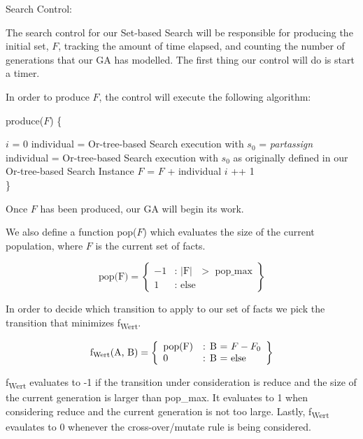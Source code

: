\documentclass[11pt, oneside]{article}   	%
\begin{document}
\noindent Search Control:

\noindent The search control for our Set-based Search will be responsible for producing the initial set, $F$, tracking the amount of time elapsed, and counting the number of generations that our GA has modelled. The first thing our control will do is start a timer.

\noindent In order to produce $F$, the control will execute the following algorithm:

\noindent produce($F$) \{
\begin{algorithmic}[\textfloatsep = 0pt]
    \STATE $i$ = 0
		\STATE individual = Or-tree-based Search execution with $s_0$ = \textit{partassign}
	\ELSE
		\STATE individual = Or-tree-based Search execution with $s_0$ as originally defined in our Or-tree-based Search Instance
	\ENDIF
	\STATE $F$ = $F$ + individual
	\STATE $i$ ++ 1
    \ENDWHILE \\ \}
\end{algorithmic}

\noindent Once $F$ has been produced, our GA will begin its work.

\noindent We also define a function pop($F$) which evaluates the size of the current population, where $F$ is the current set of facts.
 
     \[
         \text{pop(F)} = \left\{\begin{array}{ll}
             -1 & \text{: $\vert$F$\vert$ $>$ pop_max}\\
             1 & \text{: else}
             \end{array}\right\}
       \]

\noindent In order to decide which transition to apply to our set of facts we pick the transition that minimizes f\textsubscript{Wert}.
 
     \[
         \text{f\textsubscript{Wert}(A, B)} = \left\{\begin{array}{ll}
             \text{pop(F)} & \text{: B = $F - F_0$}\\
             0 & \text{: B = else }
             \end{array}\right\}
       \]

\noindent f\textsubscript{Wert} evaluates to -1 if the transition under consideration is reduce and the size of the current generation is larger than pop_max.
It evaluates to 1 when considering reduce and the current generation is not too large.
Lastly, f\textsubscript{Wert} evaulates to 0 whenever the cross-over/mutate rule is being considered.
\end{document}
